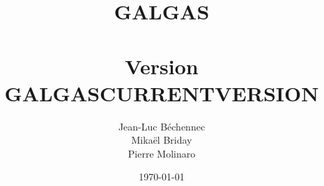 \documentclass [a4paper, 11pt] {book}
\begin{document}
 


\title{\Huge{\textbf{GALGAS}}\\~\\ \normalsize{Version GALGASCURRENTVERSION}}
\author{Jean-Luc Béchennec\\Mikaël Briday\\Pierre Molinaro}
\date \today 

\maketitle


\tableofcontents
 
\end{document}
